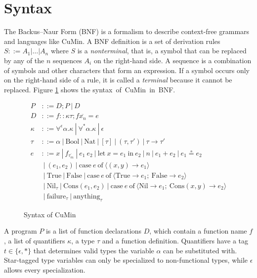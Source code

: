 \documentclass[paper = a4, fleqn, abstract=on, twoside]{scrreprt}
\begin{document}
\section{Syntax}
The Backus–Naur Form (BNF) is a formalism to describe context-free grammars and languages like CuMin. A BNF definition is a set of derivation rules $S ::= A_{1} | \dots | A_{n} $ where $S$ is a \textit{nonterminal}, that is, a symbol that can be replaced by any of the $n$ sequences $A_{i}$ on the right-hand side. A sequence is a combination of symbols and other characters that form an expression. If a symbol occurs only on the right-hand side of a rule, it is called a \textit{terminal} because it cannot be replaced. Figure \ref{cumin:syntax} shows the \mbox{syntax of CuMin in BNF.}
\vspace*{-1em}
\begin{figure}[H]
\begin{align*}
P &::= D;P \:|\:D \\
D &::= f :: \kappa \tau; f \overline{x_{n}} = e\\
\kappa &::= \forall^{\epsilon} \alpha.\kappa \:|\: \forall^{*}\alpha.\kappa \:|\: \epsilon \\
\tau &::= \alpha \:|\: \text{Bool} \:|\: \text{Nat} \:|\: [\tau] \:|\: (\tau,\tau ') \:|\: \tau \rightarrow \tau ' \\
e &::= x \:|\: f_{\overline{\tau_{m}}} \:|\: e_{1}\: e_{2} \:|\: \text{let}\: x = e_{1} \:\text{in}\: e_{2} \:|\: n \:|\: e_{1} + e_{2} \:|\: e_{1} \circeq e_{2}\\
&\:|\: (e_{1},e_{2}) \:|\: \text{case}\: e \:\text{of}\: \langle (x,y) \rightarrow e_{1}\rangle\\
&\:|\: \text{True} \:|\: \text{False} \:|\: \text{case}\: e \:\text{of}\: \langle \text{True} \rightarrow e_{1};\:\text{False} \rightarrow e_{2}\rangle\\
&\:|\: \text{Nil}_{\tau} \:|\: \text{Cons}(e_{1}, e_{2}) \:|\: \text{case}\: e \:\text{of}\: \langle \text{Nil} \rightarrow e_{1};\:\text{Cons}(x,y) \rightarrow e_{2}\rangle\\
&\:|\: \text{failure}_{\tau} \:|\: \text{anything}_{\tau}
\end{align*}
\vspace*{-1.5em}
\caption{Syntax of CuMin}
\label{cumin:syntax}
\end{figure}
\noindent
A program $P$ is a list of function declarations $D$, which contain a function name $f$, a list of quantifiers $\kappa$, a type $\tau$ and a function definition. Quantifiers have a tag \mbox{$t \in \{\epsilon, *\}$} that determines valid types the variable $\alpha$ can be substituted with. Star-tagged type variables can only be specialized to non-functional types, while $\epsilon$ allows every specialization.
\end{document}
